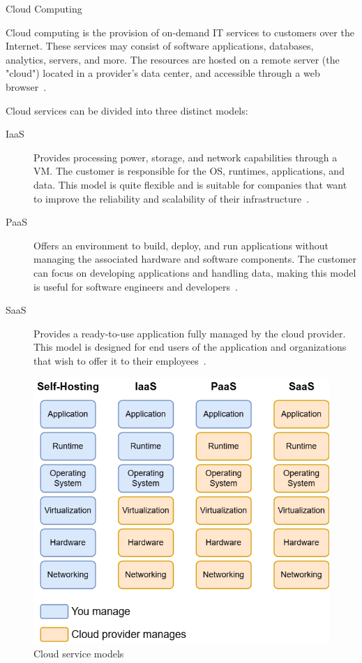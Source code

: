 \documentclass[12pt,reqno, oneside]{amsbook}
\makeatletter
\def\section{\@startsection{section}{1}%
      \z@{.5\linespacing\@plus.7\linespacing}{.25\linespacing}%
      {\normalfont\bfseries\flushleft}}
\theoremstyle{definition}
\theoremstyle{definition}
\numberwithin{section}{chapter}
\numberwithin{table}{chapter}
\numberwithin{figure}{chapter}
\makeatother
\begin{document}
\section{Cloud Computing}
\label{Section:Cloud_Computing}

Cloud computing is the provision of on-demand \ac{IT} services to customers over the Internet. These services may consist of software applications, databases, analytics, servers, and more. The resources are hosted on a remote server (the "cloud") located in a provider's data center, and accessible through a web browser~\cite{Figueira2024,  Nordic2012, Nadeem2024, Villamizar2016}.

Cloud services can be divided into three distinct models:
\begin{description}
  \item [\ac{IaaS}] Provides processing power, storage, and network capabilities through a \ac{VM}. The customer is responsible for the \ac{OS}, runtimes, applications, and data. This model is quite flexible and is suitable for companies that want to improve the reliability and scalability of their infrastructure~\cite{Figueira2024, Nordic2012, Google, Berry2021}.
  \item [\ac{PaaS}] Offers an environment to build, deploy, and run applications without managing the associated hardware and software components. The customer can focus on developing applications and handling data, making this model is useful for software engineers and developers~\cite{Figueira2024, Nordic2012, Google, Berry2021}.
  \item [\ac{SaaS}] Provides a ready-to-use application fully managed by the cloud provider. This model is designed for end users of the application and organizations that wish to offer it to their employees~\cite{Figueira2024, Nordic2012, Google, Berry2021}.
\end{description}

\FloatBarrier
\begin{figure}[H]
  \includegraphics[width=0.7\linewidth]{images/Cloud_service_models.png}
  \caption{\label{Figure:Cloud_service_models}Cloud service models}
\end{figure}
\FloatBarrier
\end{document}
